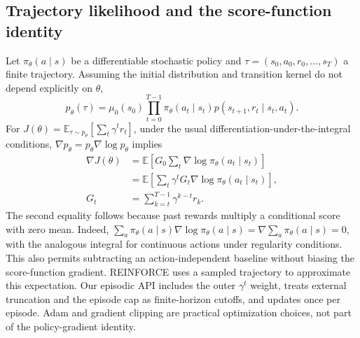 \documentclass[11pt,a4paper]{article}
\newcommand{\E}{\mathbb E}
\begin{document}
\subsection{Trajectory likelihood and the score-function identity}
Let $\pi_\theta(a\mid s)$ be a differentiable stochastic policy and
$\tau=(s_0,a_0,r_0,\ldots,s_T)$ a finite trajectory. Assuming the initial
distribution and transition kernel do not depend explicitly on $\theta$,
\[
p_\theta(\tau)=\mu_0(s_0)\prod_{t=0}^{T-1}
\pi_\theta(a_t\mid s_t)p(s_{t+1},r_t\mid s_t,a_t).
\]
For $J(\theta)=\E_{\tau\sim p_\theta}[\sum_t\gamma^t r_t]$,
under the usual differentiation-under-the-integral conditions,
$\nabla p_\theta=p_\theta\nabla\log p_\theta$ implies
\begin{align*}
\nabla J(\theta)&=\E\left[G_0\sum_t\nabla\log\pi_\theta(a_t\mid s_t)\right]\\
&=\E\left[\sum_t\gamma^t G_t\nabla\log\pi_\theta(a_t\mid s_t)\right],\\
G_t&=\sum_{k=t}^{T-1}\gamma^{k-t}r_k.
\end{align*}
The second equality follows because past rewards multiply a conditional
score with zero mean. Indeed,
$\sum_a\pi_\theta(a\mid s)\nabla\log\pi_\theta(a\mid s)
=\nabla\sum_a\pi_\theta(a\mid s)=0$, with the analogous integral for
continuous actions under regularity conditions. This also permits subtracting
an action-independent baseline without biasing the score-function gradient.
REINFORCE \cite{williams} uses a sampled trajectory to approximate this
expectation. Our episodic API includes the outer $\gamma^t$ weight, treats
external truncation and the episode cap as finite-horizon cutoffs, and updates
once per episode. Adam and gradient clipping are practical optimization
choices, not part of the policy-gradient identity.
\end{document}

